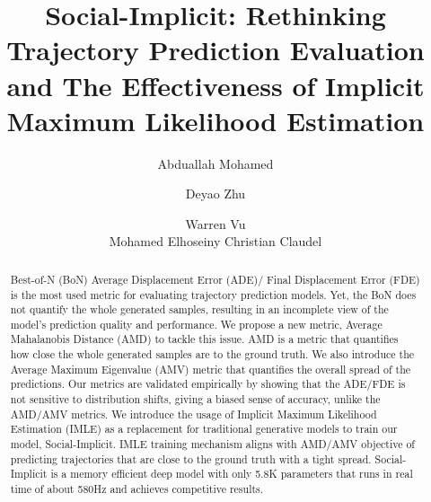 \documentclass[runningheads]{llncs}
\begin{document}
\pagestyle{headings}
\mainmatter

\title{Social-Implicit: Rethinking Trajectory Prediction Evaluation and The Effectiveness of Implicit Maximum Likelihood Estimation} 
\author{Abduallah Mohamed\and
Deyao Zhu \and
Warren Vu \\
Mohamed Elhoseiny 
Christian Claudel
}
\maketitle

\begin{abstract}
Best-of-N (BoN) Average Displacement Error (ADE)/ Final Displacement Error (FDE) is the most used metric for evaluating trajectory prediction models. Yet, the BoN does not quantify the whole generated samples, resulting in an incomplete view of the model’s prediction quality and performance. We propose a new metric, Average Mahalanobis Distance (AMD) to tackle this issue. AMD is a metric that quantifies how close the whole generated samples are to the ground truth. We also introduce the Average Maximum Eigenvalue (AMV) metric that quantifies the overall spread of the predictions. Our metrics are validated empirically by showing that the ADE/FDE is not sensitive to distribution shifts, giving a biased sense of accuracy, unlike the AMD/AMV metrics. We introduce the usage of Implicit Maximum Likelihood Estimation (IMLE) as a replacement for traditional generative models to train our model, Social-Implicit. IMLE training mechanism aligns with AMD/AMV objective of predicting trajectories that are close to the ground truth with a tight spread. Social-Implicit is a memory efficient deep model with only 5.8K parameters that runs in real time of about 580Hz and achieves competitive results.
\end{abstract}
\end{document}
